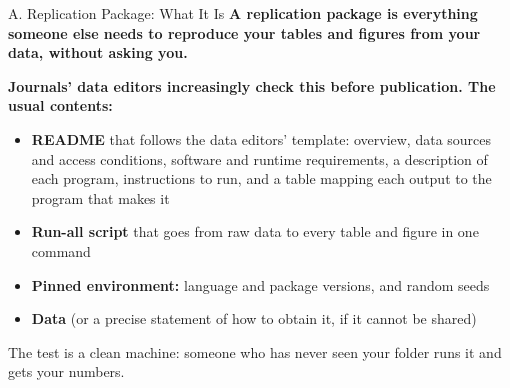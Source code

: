\documentclass[aspectratio=169, 11pt]{beamer}
\begin{document}
\begin{frame}[label=repl]{A. Replication Package: What It Is}
  \textbf{A replication package is everything someone else needs to reproduce your tables and figures from your data, without asking you.}

  \vspace{0.5em}
  \textbf{Journals' data editors increasingly check this before publication. The usual contents:}
  \begin{itemize}
    \item \textbf{README} that follows the data editors' template: overview, data sources and access conditions, software and runtime requirements, a description of each program, instructions to run, and a table mapping each output to the program that makes it
    \item \textbf{Run-all script} that goes from raw data to every table and figure in one command
    \item \textbf{Pinned environment:} language and package versions, and random seeds
    \item \textbf{Data} (or a precise statement of how to obtain it, if it cannot be shared)
  \end{itemize}

  \vspace{0.5em}
  \alert{The test is a clean machine: someone who has never seen your folder runs it and gets your numbers.}
\end{frame}
\end{document}
